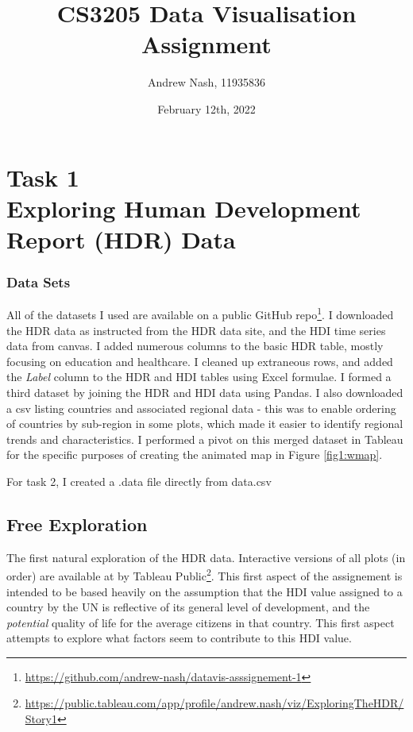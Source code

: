\documentclass[ 10pt ]{fphw}
\title{CS3205 Data Visualisation Assignment}
\author{Andrew Nash, 11935836}
\date{February 12th, 2022}
\institute{University College Cork \\ BSc Data Science \& Analytics }
\begin{document}
\maketitle 

\section*{Task 1 \\ Exploring Human Development Report (HDR) Data}
\subsubsection*{Data Sets}

All of the datasets I used are available on a public GitHub repo\footnote{\url{https://github.com/andrew-nash/datavis-asssignement-1}}. I downloaded the HDR data as instructed from the HDR data site, and the HDI time series data from canvas. I added numerous columns to the basic HDR table, mostly focusing on education and healthcare. I cleaned up extraneous rows, and added the \emph{Label} column to the HDR and HDI tables using Excel formulae. I formed a third dataset by joining the HDR and HDI data using Pandas. I also downloaded a csv listing countries and associated regional data - this was to enable ordering of countries by sub-region in some plots, which made it easier to identify regional trends and characteristics. I performed a pivot on this merged dataset in Tableau for the specific purposes of creating the animated map in Figure \ref{fig1:wmap}. 

For task 2, I created a .data file directly from data.csv
\subsection*{Free Exploration}
\vspace{1cm}
The first natural exploration of the HDR data. Interactive versions of all plots (in order) are available at by Tableau Public\footnote{\url{https://public.tableau.com/app/profile/andrew.nash/viz/ExploringTheHDR/Story1}}. This first aspect of the assignement is intended to be based heavily on the assumption that the HDI value assigned to a country by the UN is reflective of its general level of development, and the \textit{potential} quality of life for the average citizens in that country. This first aspect attempts to explore what factors seem to contribute to this HDI value.
\end{document}
